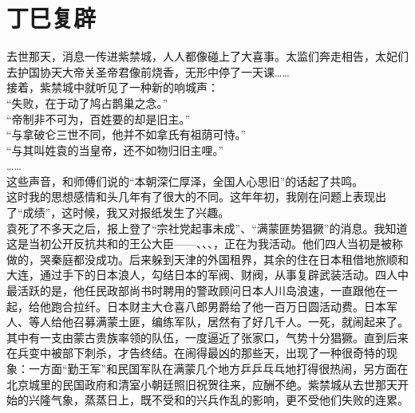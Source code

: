 \fancyhead[RO]{} %
\fancyhead[LE]{} %
\chapter*{丁巳复辟}
\thispagestyle{empty}
去世那天，消息一传进紫禁城，人人都像碰上了大喜事。太监们奔走相告，太妃们去护国协天大帝关圣帝君像前烧香，无形中停了一天课……\\

接着，紫禁城中就听见了一种新的响城声：\\

“失败，在于动了鸠占鹊巢之念。”\\

“帝制非不可为，百姓要的却是旧主。”\\

“与拿破仑三世不同，他并不如拿氏有祖荫可恃。”\\

“与其叫姓袁的当皇帝，还不如物归旧主哩。”\\

……\\

这些声音，和师傅们说的“本朝深仁厚泽，全国人心思旧”的话起了共鸣。\\

这时我的思想感情和头几年有了很大的不同。这年年初，我刚在问题上表现出了“成绩”，这时候，我又对报纸发生了兴趣。\\

袁死了不多天之后，报上登了“宗社党起事未成”、“满蒙匪势猖獗”的消息。我知道这是当初公开反抗共和的王公大臣——、、、，正在为我活动。他们四人当初是被称做的，哭秦庭都没成功。后来躲到天津的外国租界，其余的住在日本租借地旅顺和大连，通过手下的日本浪人，勾结日本的军阀、财阀，从事复辟武装活动。四人中最活跃的是，他任民政部尚书时聘用的警政顾问日本人川岛浪速，一直跟他在一起，给他跑合拉纤。日本财主大仓喜八郎男爵给了他一百万日圆活动费。日本军人、等人给他召募满蒙土匪，编练军队，居然有了好几千人。一死，就闹起来了。其中有一支由蒙古贵族率领的队伍，一度逼近了张家口，气势十分猖獗。直到后来在兵变中被部下刺杀，才告终结。在闹得最凶的那些天，出现了一种很奇特的现象：一方面“勤王军”和民国军队在满蒙几个地方乒乒乓乓地打得很热闹，另方面在北京城里的民国政府和清室小朝廷照旧祝贺往来，应酬不绝。紫禁城从去世那天开始的兴隆气象，蒸蒸日上，既不受和的兴兵作乱的影响，更不受他们失败的连累。\\

